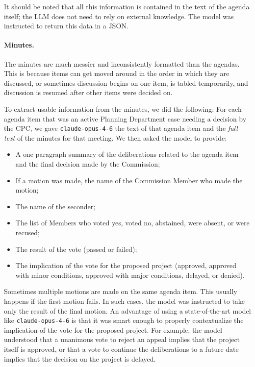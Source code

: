 \noindent It should be noted that all this information is contained in the text of the agenda itself; the LLM does not need to rely on external knowledge. The model was instructed to return this data in a JSON. 

\paragraph{Minutes.} The minutes are much messier and inconsistently formatted than the agendas. This is because items can get moved around in the order in which they are discussed, or sometimes discussion begins on one item, is tabled temporarily, and discussion is resumed after other items were decided on. 

To extract usable information from the minutes, we did the following: For each agenda item that was an active Planning Department case needing a decision by the CPC, we gave \texttt{claude-opus-4-6} the text of that agenda item and the \emph{full text} of the minutes for that meeting. We then asked the model to provide:
\begin{itemize}
\item A one paragraph summary of the deliberations related to the agenda item and the final decision made by the Commission;
\item If a motion was made, the name of the Commission Member who made the motion;
\item The name of the seconder;
\item The list of Members who voted yes, voted no, abstained, were absent, or were recused;
\item The result of the vote (passed or failed);
\item The implication of the vote for the proposed project (approved, approved with minor conditions, approved with major conditions, delayed, or denied).
\end{itemize}
Sometimes multiple motions are made on the same agenda item. This usually happens if the first motion fails. In such cases, the model was instructed to take only the result of the final motion. An advantage of using a state-of-the-art model like \texttt{claude-opus-4-6} is that it was smart enough to properly contextualize the implication of the vote for the proposed project. For example, the model understood that a unanimous vote to reject an appeal implies that the project itself is approved, or that a vote to continue the deliberations to a future date implies that the decision on the project is delayed.

